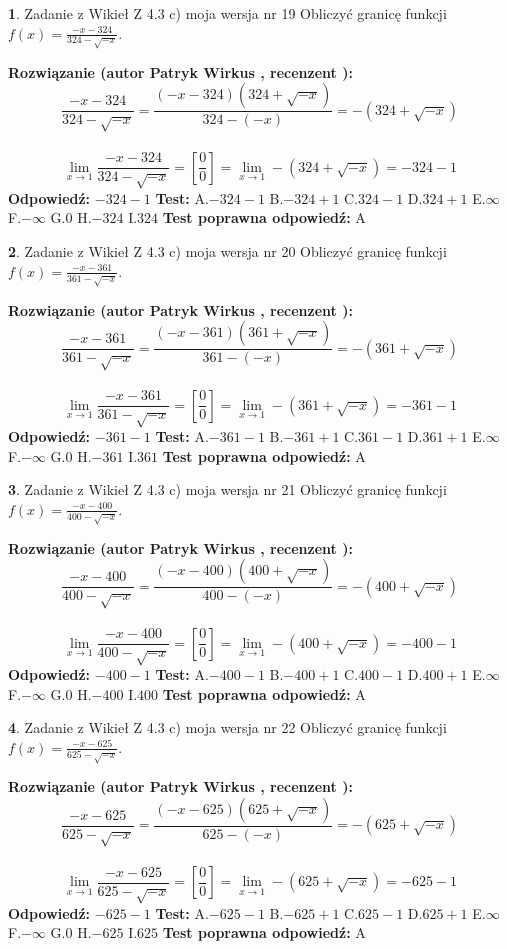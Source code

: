 \documentclass[12pt, a4paper]{article}
\theoremstyle{definition} %
\newtheorem{zad}{}
\newcommand{\zadStart}[1]{\begin{zad}#1\newline}
\newcommand{\zadStop}{\end{zad}}
\newcommand{\rozwStart}[2]{\noindent \textbf{Rozwiązanie (autor #1 , recenzent #2): }\newline}
\newcommand{\rozwStop}{\newline}
\newcommand{\odpStart}{\noindent \textbf{Odpowiedź:}\newline}
\newcommand{\odpStop}{\newline}
\newcommand{\testStart}{\noindent \textbf{Test:}\newline}
\newcommand{\testStop}{\newline}
\newcommand{\kluczStart}{\noindent \textbf{Test poprawna odpowiedź:}\newline}
\newcommand{\kluczStop}{\newline}
\begin{document}
\zadStart{Zadanie z Wikieł Z 4.3 c) moja wersja nr 19}
Obliczyć granicę funkcji $f(x)=\frac{-x-324}{324-\sqrt{-x}}$.
\zadStop
\rozwStart{Patryk Wirkus}{}
$$\frac{-x-324}{324-\sqrt{-x}}=\frac{(-x-324)(324+\sqrt{-x})}{324-(-x)}=-(324+\sqrt{-x})$$
\\
$$\lim\limits_{x\to1}\frac{-x-324}{324-\sqrt{-x}}=[\frac{0}{0}]=\lim\limits_{x\to1}-(324+\sqrt{-x}) =-324-1$$
\rozwStop
\odpStart
$-324-1$
\odpStop
\testStart
A.$-324-1$
B.$-324+1$
C.$324-1$
D.$324+1$
E.$\infty$
F.$-\infty$
G.$0$
H.$-324$
I.$324$
\testStop
\kluczStart
A
\kluczStop



\zadStart{Zadanie z Wikieł Z 4.3 c) moja wersja nr 20}
Obliczyć granicę funkcji $f(x)=\frac{-x-361}{361-\sqrt{-x}}$.
\zadStop
\rozwStart{Patryk Wirkus}{}
$$\frac{-x-361}{361-\sqrt{-x}}=\frac{(-x-361)(361+\sqrt{-x})}{361-(-x)}=-(361+\sqrt{-x})$$
\\
$$\lim\limits_{x\to1}\frac{-x-361}{361-\sqrt{-x}}=[\frac{0}{0}]=\lim\limits_{x\to1}-(361+\sqrt{-x}) =-361-1$$
\rozwStop
\odpStart
$-361-1$
\odpStop
\testStart
A.$-361-1$
B.$-361+1$
C.$361-1$
D.$361+1$
E.$\infty$
F.$-\infty$
G.$0$
H.$-361$
I.$361$
\testStop
\kluczStart
A
\kluczStop



\zadStart{Zadanie z Wikieł Z 4.3 c) moja wersja nr 21}
Obliczyć granicę funkcji $f(x)=\frac{-x-400}{400-\sqrt{-x}}$.
\zadStop
\rozwStart{Patryk Wirkus}{}
$$\frac{-x-400}{400-\sqrt{-x}}=\frac{(-x-400)(400+\sqrt{-x})}{400-(-x)}=-(400+\sqrt{-x})$$
\\
$$\lim\limits_{x\to1}\frac{-x-400}{400-\sqrt{-x}}=[\frac{0}{0}]=\lim\limits_{x\to1}-(400+\sqrt{-x}) =-400-1$$
\rozwStop
\odpStart
$-400-1$
\odpStop
\testStart
A.$-400-1$
B.$-400+1$
C.$400-1$
D.$400+1$
E.$\infty$
F.$-\infty$
G.$0$
H.$-400$
I.$400$
\testStop
\kluczStart
A
\kluczStop



\zadStart{Zadanie z Wikieł Z 4.3 c) moja wersja nr 22}
Obliczyć granicę funkcji $f(x)=\frac{-x-625}{625-\sqrt{-x}}$.
\zadStop
\rozwStart{Patryk Wirkus}{}
$$\frac{-x-625}{625-\sqrt{-x}}=\frac{(-x-625)(625+\sqrt{-x})}{625-(-x)}=-(625+\sqrt{-x})$$
\\
$$\lim\limits_{x\to1}\frac{-x-625}{625-\sqrt{-x}}=[\frac{0}{0}]=\lim\limits_{x\to1}-(625+\sqrt{-x}) =-625-1$$
\rozwStop
\odpStart
$-625-1$
\odpStop
\testStart
A.$-625-1$
B.$-625+1$
C.$625-1$
D.$625+1$
E.$\infty$
F.$-\infty$
G.$0$
H.$-625$
I.$625$
\testStop
\kluczStart
A
\kluczStop
\end{document}
